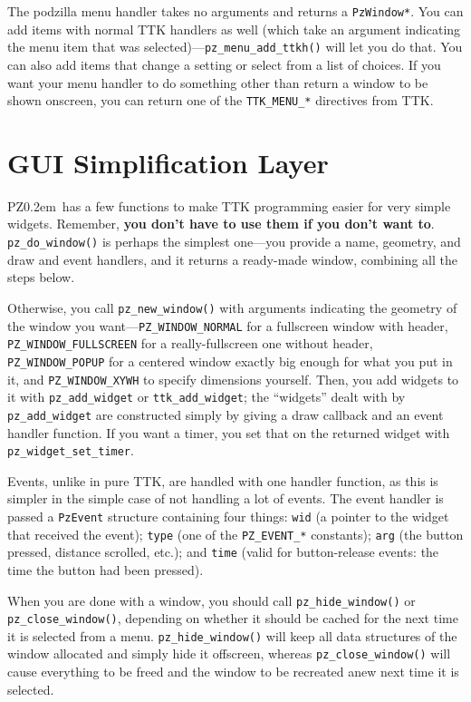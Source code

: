 \documentclass[12pt,letterpaper]{report}
\def\pz{{\footnotesize PZ}}
\def\pzt{\pz\kern0.2em{\large\oldstyle2}}
\begin{document}
The podzilla menu handler takes no arguments and returns a \verb|PzWindow*|. You can add items with
normal TTK handlers as well (which take an argument indicating the menu item that was
selected)---\verb|pz_menu_add_ttkh()| will let you do that. You can also add items that change
a setting or select from a list of choices. If you want your menu handler to do something
other than return a window to be shown onscreen, you can return one of the \verb|TTK_MENU_*| directives
from TTK.

\section{GUI Simplification Layer}
\pzt\ has a few functions to make TTK programming easier for very simple widgets.
Remember, {\bf you don't have to use them if you don't want to}.
\verb|pz_do_window()| is perhaps the simplest one---you provide a name, geometry, and
draw and event handlers, and it returns a ready-made window, combining all the steps below.

Otherwise, you call \verb|pz_new_window()| with arguments indicating the geometry of the
window you want---\verb|PZ_WINDOW_NORMAL| for a fullscreen window with header,
\verb|PZ_WINDOW_FULLSCREEN| for a really-fullscreen one without header, \verb|PZ_WINDOW_POPUP|
for a centered window exactly big enough for what you put in it, and \verb|PZ_WINDOW_XYWH|
to specify dimensions yourself. Then, you add widgets to it with \verb|pz_add_widget| or
\verb|ttk_add_widget|; the ``widgets'' dealt with by \verb|pz_add_widget| are constructed
simply by giving a draw callback and an event handler function. If you want a timer,
you set that on the returned widget with \verb|pz_widget_set_timer|.

Events, unlike in pure TTK, are handled with one handler function, as this is simpler in
the simple case of not handling a lot of events. The event handler is passed a \verb|PzEvent|
structure containing four things: \verb|wid| (a pointer to the widget that received the event);
\verb|type| (one of the \verb|PZ_EVENT_*| constants); \verb|arg| (the button pressed, distance
scrolled, etc.); and \verb|time| (valid for button-release events: the time the button had been
pressed).

When you are done with a window, you should call \verb|pz_hide_window()| or \verb|pz_close_window()|,
depending on whether it should be cached for the next time it is selected from a menu.
\verb|pz_hide_window()| will keep all data structures of the window allocated and simply hide
it offscreen, whereas \verb|pz_close_window()| will cause everything to be freed and the window
to be recreated anew next time it is selected.
\end{document}
